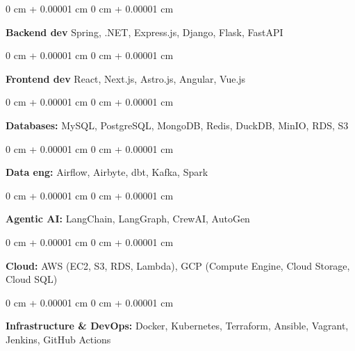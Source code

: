 \documentclass[10pt, letterpaper]{article}
\newenvironment{onecolentry}{
    \begin{adjustwidth}{
        0 cm + 0.00001 cm
    }{
        0 cm + 0.00001 cm
    }
}{
    \end{adjustwidth}
} %
\begin{document}
        \vspace{0.2 cm}

        \begin{onecolentry}
            \textbf{Backend dev} Spring, .NET, Express.js, Django, Flask, FastAPI
        \end{onecolentry}

                \vspace{0.2 cm}


                \begin{onecolentry}
            \textbf{Frontend dev} React, Next.js, Astro.js, Angular, Vue.js
        \end{onecolentry}


        \vspace{0.2 cm}

        \begin{onecolentry}
          \textbf{Databases:} MySQL, PostgreSQL, MongoDB, Redis, DuckDB, MinIO, RDS, S3
        \end{onecolentry}

        \vspace{0.2 cm}

        \begin{onecolentry}
          \textbf{Data eng: }  Airflow, Airbyte, dbt, Kafka, Spark
        \end{onecolentry}

        \vspace{0.2 cm}

                \begin{onecolentry}
          \textbf{Agentic AI:} LangChain, LangGraph, CrewAI, AutoGen
        \end{onecolentry}

        \vspace{0.2 cm}


        \begin{onecolentry}
          \textbf{Cloud:} AWS (EC2, S3, RDS, Lambda), GCP (Compute Engine, Cloud Storage, Cloud SQL)
        \end{onecolentry}

                \vspace{0.2 cm}


        \begin{onecolentry}
          \textbf{Infrastructure \& DevOps:} Docker, Kubernetes, Terraform, Ansible, Vagrant, Jenkins, GitHub Actions
        \end{onecolentry}
\end{document}
